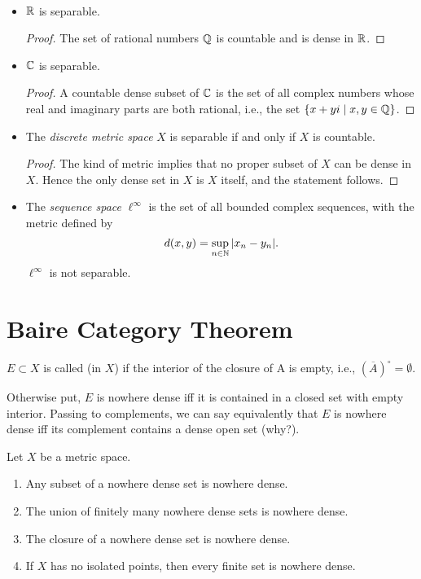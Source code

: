\begin{example} \
\begin{itemize}
\item $\mathbb R$ is separable.
\begin{proof}
The set of rational numbers $\mathbb Q$ is countable and is dense in $\mathbb R$.
\end{proof}

\item $\mathbb C$ is separable.
\begin{proof}
A countable dense subset of $\mathbb C$ is the set of all complex numbers whose real and imaginary parts are both rational, i.e., the set $\{x+yi\mid x,y\in\mathbb Q\}$.
\end{proof}

\item The \emph{discrete metric space} $X$ is separable if and only if $X$ is countable.
\begin{proof}
The kind of metric implies that no proper subset of $X$ can be dense in $X$. Hence the only dense set in $X$ is $X$ itself, and the statement follows. 
\end{proof}

\item The \emph{sequence space} $\ell^\infty$ is the set of all bounded complex sequences, with the metric defined by
\[d(x,y)=\sup_{n\in\mathbb N}|x_n-y_n|.\]
$\ell^\infty$ is not separable.
\end{itemize}
\end{example}
\pagebreak

\section{Baire Category Theorem}
$E\subset X$ is called  (in $X$) if the interior of the closure of A is empty, i.e., $(\overline{A})^\circ=\emptyset$. 

Otherwise put, $E$ is nowhere dense iff it is contained in a closed set with empty interior. Passing to complements, we can say equivalently that $E$ is nowhere dense iff its complement contains a dense open set (why?).

\begin{lemma}
Let $X$ be a metric space.
\begin{enumerate}[label=(\roman*)]
\item Any subset of a nowhere dense set is nowhere dense.
\item The union of finitely many nowhere dense sets is nowhere dense.
\item The closure of a nowhere dense set is nowhere dense.
\item If $X$ has no isolated points, then every finite set is nowhere dense.
\end{enumerate}
\end{lemma}

